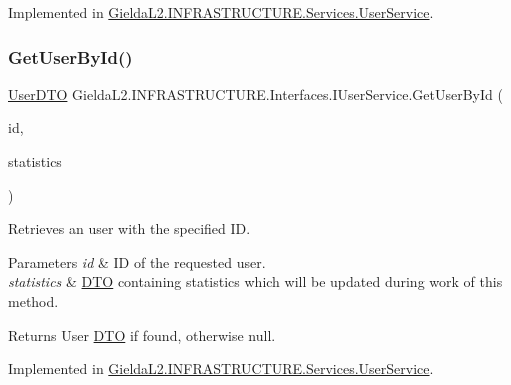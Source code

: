 Implemented in \mbox{\hyperlink{class_gielda_l2_1_1_i_n_f_r_a_s_t_r_u_c_t_u_r_e_1_1_services_1_1_user_service_a448582ca4e54e603f4dd8a5a12c4bed4}{Gielda\+L2.\+I\+N\+F\+R\+A\+S\+T\+R\+U\+C\+T\+U\+R\+E.\+Services.\+User\+Service}}.

\mbox{\label{interface_gielda_l2_1_1_i_n_f_r_a_s_t_r_u_c_t_u_r_e_1_1_interfaces_1_1_i_user_service_a2fd0719208e4bd393517dece3b039564}} 
\subsubsection{\texorpdfstring{GetUserById()}{GetUserById()}}
{\footnotesize\ttfamily \mbox{\hyperlink{class_gielda_l2_1_1_i_n_f_r_a_s_t_r_u_c_t_u_r_e_1_1_d_t_o_1_1_user_d_t_o}{User\+D\+TO}} Gielda\+L2.\+I\+N\+F\+R\+A\+S\+T\+R\+U\+C\+T\+U\+R\+E.\+Interfaces.\+I\+User\+Service.\+Get\+User\+By\+Id (\begin{DoxyParamCaption}\item[{int}]{id,  }\item[{\mbox{\hyperlink{class_gielda_l2_1_1_i_n_f_r_a_s_t_r_u_c_t_u_r_e_1_1_d_t_o_1_1_statistics_d_t_o}{Statistics\+D\+TO}}}]{statistics }\end{DoxyParamCaption})}



Retrieves an user with the specified ID. 


\begin{DoxyParams}{Parameters}
{\em id} & ID of the requested user.\\
\hline
{\em statistics} & \mbox{\hyperlink{namespace_gielda_l2_1_1_i_n_f_r_a_s_t_r_u_c_t_u_r_e_1_1_d_t_o}{D\+TO}} containing statistics which will be updated during work of this method.\\
\hline
\end{DoxyParams}
\begin{DoxyReturn}{Returns}
User \mbox{\hyperlink{namespace_gielda_l2_1_1_i_n_f_r_a_s_t_r_u_c_t_u_r_e_1_1_d_t_o}{D\+TO}} if found, otherwise null.
\end{DoxyReturn}


Implemented in \mbox{\hyperlink{class_gielda_l2_1_1_i_n_f_r_a_s_t_r_u_c_t_u_r_e_1_1_services_1_1_user_service_a92394250a4617bc33dce562feabb6296}{Gielda\+L2.\+I\+N\+F\+R\+A\+S\+T\+R\+U\+C\+T\+U\+R\+E.\+Services.\+User\+Service}}.

